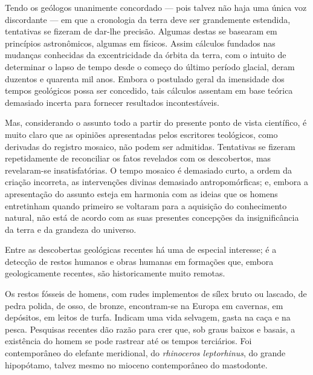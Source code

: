 \documentclass[11pt,a5paper,twoside,openany]{book}
\begin{document}
Tendo os geólogos unanimente concordado — pois talvez não haja uma única voz discordante — em que a cronologia da terra deve ser grandemente estendida, tentativas se fizeram de dar-lhe precisão. Algumas destas se basearam em princípios astronômicos, algumas em físicos. Assim cálculos fundados nas mudanças conhecidas da excentricidade da órbita da terra, com o intuito de determinar o lapso de tempo desde o começo do último período glacial, deram duzentos e quarenta mil anos. Embora o postulado geral da imensidade dos tempos geológicos possa ser concedido, tais cálculos assentam em base teórica demasiado incerta para fornecer resultados incontestáveis.

Mas, considerando o assunto todo a partir do presente ponto de vista científico, é muito claro que as opiniões apresentadas pelos escritores teológicos, como derivadas do registro mosaico, não podem ser admitidas. Tentativas se fizeram repetidamente de reconciliar os fatos revelados com os descobertos, mas revelaram-se insatisfatórias. O tempo mosaico é demasiado curto, a ordem da criação incorreta, as intervenções divinas demasiado antropomórficas; e, embora a apresentação do assunto esteja em harmonia com as ideias que os homens entretinham quando primeiro se voltaram para a aquisição do conhecimento natural, não está de acordo com as suas presentes concepções da insignificância da terra e da grandeza do universo.

Entre as descobertas geológicas recentes há uma de especial interesse; é a detecção de restos humanos e obras humanas em formações que, embora geologicamente recentes, são historicamente muito remotas.

Os restos fósseis de homens, com rudes implementos de sílex bruto ou lascado, de pedra polida, de osso, de bronze, encontram-se na Europa em cavernas, em depósitos, em leitos de turfa. Indicam uma vida selvagem, gasta na caça e na pesca. Pesquisas recentes dão razão para crer que, sob graus baixos e basais, a existência do homem se pode rastrear até os tempos terciários. Foi contemporâneo do elefante meridional, do \textit{rhinoceros leptorhinus}, do grande hipopótamo, talvez mesmo no mioceno contemporâneo do mastodonte.
\end{document}
